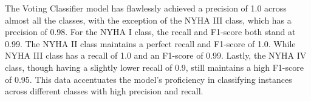 The Voting Classifier model has flawlessly achieved a precision of 1.0 across almost all the classes, with the exception of the NYHA III class, which has a precision of 0.98. For the NYHA I class, the recall and F1-score both stand at 0.99. The NYHA II class maintains a perfect recall and F1-score of 1.0. While NYHA III class has a recall of 1.0 and an F1-score of 0.99. Lastly, the NYHA IV class, though having a slightly lower recall of 0.9, still maintains a high F1-score of 0.95. This data accentuates the model's proficiency in classifying instances across different classes with high precision and recall.

